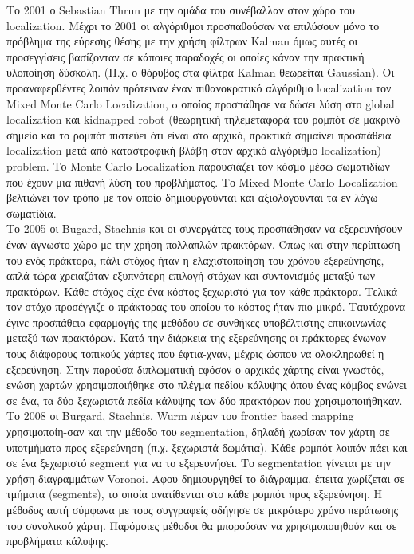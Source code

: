 	Το 2001 ο Sebastian Thrun \cite{Thrun2001} με την ομάδα του συνέβαλλαν στον χώρο του localization. 
	Μέχρι το 2001 οι αλγόριθμοι προσπαθούσαν να επιλύσουν μόνο το πρόβλημα της εύρεσης θέσης με την χρήση φίλτρων Kalman 
	όμως αυτές οι προσεγγίσεις βασίζονταν σε κάποιες παραδοχές οι οποίες κάναν την πρακτική υλοποίηση δύσκολη. (Π.χ. ο θόρυβος στα φίλτρα Kalman 
	θεωρείται Gaussian). Οι προαναφερθέντες λοιπόν πρότειναν έναν πιθανοκρατικό αλγόριθμο localization τον Mixed Monte Carlo Localization,
	o οποίος προσπάθησε να δώσει λύση στο global localization και kidnapped robot (θεωρητική τηλεμεταφορά του ρομπότ σε μακρινό σημείο 
	και το ρομπότ πιστεύει ότι είναι στο αρχικό, πρακτικά σημαίνει προσπάθεια localization μετά από καταστροφική βλάβη 
	στον αρχικό αλγόριθμο localization) problem. Το Monte Carlo Localization παρουσιάζει τον κόσμο μέσω σωματιδίων που έχουν μια πιθανή λύση του προβλήματος. 
	Το Mixed Monte Carlo Localization βελτιώνει τον τρόπο με τον οποίο δημιουργούνται και αξιολογούνται τα εν λόγω σωματίδια. \\
	
	 Το 2005 οι Bugard, Stachnis \cite{Burgard2005} και οι συνεργάτες τους προσπάθησαν να εξερευνήσουν έναν άγνωστο χώρο με την χρήση πολλαπλών πρακτόρων. Όπως και στην περίπτωση του ενός πράκτορα, πάλι στόχος ήταν η ελαχιστοποίηση του χρόνου εξερεύνησης, απλά τώρα χρειαζόταν εξυπνότερη επιλογή στόχων και συντονισμός μεταξύ των πρακτόρων. Κάθε στόχος είχε ένα κόστος ξεχωριστό για τον κάθε πράκτορα. Τελικά τον στόχο προσέγγιζε ο πράκτορας του οποίου το κόστος ήταν πιο μικρό. Ταυτόχρονα έγινε προσπάθεια εφαρμογής της μεθόδου σε συνθήκες υποβέλτιστης επικοινωνίας μεταξύ των πρακτόρων. Κατά την διάρκεια της εξερεύνησης οι πράκτορες ένωναν τους διάφορους τοπικούς χάρτες που έφτια-χναν, μέχρις ώσπου να ολοκληρωθεί η εξερεύνηση. Στην παρούσα διπλωματική εφόσον ο αρχικός χάρτης είναι γνωστός, ενώση χαρτών χρησιμοποιήθηκε στο πλέγμα πεδίου κάλυψης όπου ένας κόμβος ενώνει σε ένα, τα δύο ξεχωριστά πεδία κάλυψης των δύο πρακτόρων που χρησιμοποιήθηκαν. \\
	
	
	Το 2008 οι Burgard, Stachnis, Wurm \cite{Wurm2008} πέραν του frontier based mapping χρησιμοποίη-σαν και την μέθοδο του segmentation, 
	δηλαδή χωρίσαν τον χάρτη σε υποτμήματα προς εξερεύνηση (π.χ. ξεχωριστά δωμάτια). Κάθε ρομπότ λοιπόν πάει και σε ένα ξεχωριστό segment 
	για να το εξερευνήσει. Το segmentation γίνεται με την χρήση διαγραμμάτων Voronoi. Αφου δημιουργηθεί το διάγραμμα, έπειτα χωρίζεται 
	σε τμήματα (segments), το οποία ανατίθενται στο κάθε ρομπότ προς εξερεύνηση. Η μέθοδος αυτή σύμφωνα με τους συγγραφείς οδήγησε σε 
	μικρότερο χρόνο περάτωσης του συνολικού χάρτη. Παρόμοιες μέθοδοι θα
	μπορούσαν να χρησιμοποιηθούν και σε προβλήματα κάλυψης. \\
	
